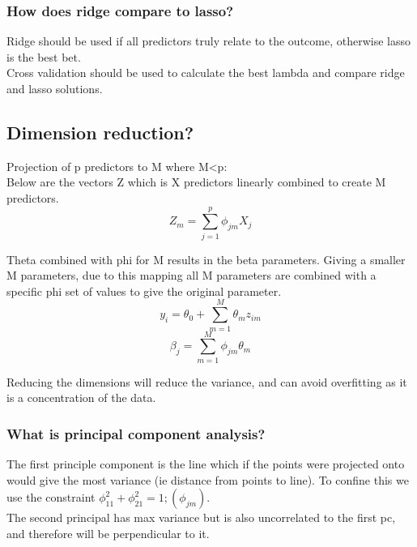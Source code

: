 \documentclass[11pt]{scrartcl} %
\begin{document}
\subsubsection{How does ridge compare to lasso?}

Ridge should be used if all predictors truly relate to the outcome, otherwise lasso is the best bet.\\

Cross validation should be used to calculate the best lambda and compare ridge and lasso solutions.

\subsection{Dimension reduction?}

Projection of p predictors to M where M<p:\\

Below are the vectors Z which is X predictors linearly combined to create M predictors.
\begin{equation}
	Z_m = \sum^p_{j=1}{\phi_{jm}X_j}
\end{equation}

Theta combined with phi for M results in the beta parameters. Giving a smaller M parameters, due to this
mapping all M parameters are combined with a specific phi set of values to give the original parameter.
\begin{equation}
	y_i= \theta_0 + \sum^M_{m=1}{\theta_mz_{im}}
\end{equation}
\begin{equation}
	\beta_j = \sum^M_{m=1}{\phi_{jm}\theta_m}
\end{equation}

Reducing the dimensions will reduce the variance, and can avoid overfitting as it is a concentration
of the data.

\subsubsection{What is principal component analysis?}

The first principle component is the line which if the points were projected onto would give the
most variance (ie distance from points to line). To confine this we use the constraint 
\(\phi_{11}^2 + \phi_{21}^2 =1; (\phi_{jm})\).\\

The second principal has max variance but is also uncorrelated to the first pc, and therefore will
be perpendicular to it.
\end{document}
